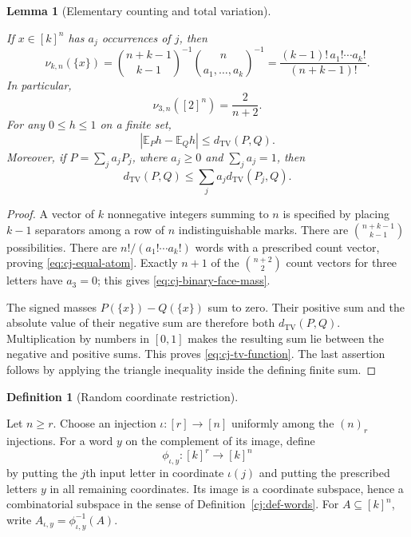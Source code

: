 \documentclass[11pt]{amsart}
\newtheorem{lemma}[theorem]{Lemma}
\theoremstyle{definition}
\newtheorem{definition}[theorem]{Definition}
\theoremstyle{remark}
\numberwithin{equation}{section}
\providecommand{\lean}[1]{}
\providecommand{\leanok}{}
\begin{document}
\begin{lemma}[Elementary counting and total variation]\label{cj:probability-facts}
\lean{Auto.cj_probability_facts_atom,Auto.cj_probability_facts_binary_face_mass,Auto.cj_probability_facts_tv_function,Auto.cj_probability_facts_mixture}
\leanok
If $x\in[k]^n$ has $a_j$ occurrences of $j$, then
\begin{equation}\label{eq:cj-equal-atom}
 \nu_{k,n}(\{x\})
 =\binom{n+k-1}{k-1}^{-1}\binom{n}{a_1,\ldots,a_k}^{-1}
 =\frac{(k-1)!\,a_1!\cdots a_k!}{(n+k-1)!}.
\end{equation}
In particular,
\begin{equation}\label{eq:cj-binary-face-mass}
 \nu_{3,n}([2]^n)=\frac{2}{n+2}.
\end{equation}
For any $0\le h\le1$ on a finite set,
\begin{equation}\label{eq:cj-tv-function}
 |\mathbb E_P h-\mathbb E_Qh|\le d_{\mathrm{TV}}(P,Q).
\end{equation}
Moreover, if $P=\sum_j a_jP_j$, where $a_j\ge0$ and $\sum_j a_j=1$,
then
\[
 d_{\mathrm{TV}}(P,Q)\le\sum_j a_jd_{\mathrm{TV}}(P_j,Q).
\]
\end{lemma}
\begin{proof}
A vector of $k$ nonnegative integers summing to $n$ is specified by
placing $k-1$ separators among a row of $n$ indistinguishable marks.
There are $\binom{n+k-1}{k-1}$ possibilities.  There are
$n!/(a_1!\cdots a_k!)$ words with a prescribed count vector, proving
\eqref{eq:cj-equal-atom}.  Exactly $n+1$ of the
$\binom{n+2}{2}$ count vectors for three letters have $a_3=0$;
this gives \eqref{eq:cj-binary-face-mass}.

The signed masses $P(\{x\})-Q(\{x\})$ sum to zero.  Their positive
sum and the absolute value of their negative sum are therefore both
$d_{\mathrm{TV}}(P,Q)$.  Multiplication by numbers in $[0,1]$ makes
the resulting sum lie between the negative and positive sums.  This
proves \eqref{eq:cj-tv-function}.  The last assertion follows by
applying the triangle inequality inside the defining finite sum.
\end{proof}

\begin{definition}[Random coordinate restriction]\label{cj:restriction}
\lean{Auto.restrictMap,Auto.restrictPre}
Let $n\ge r$.  Choose an injection $\iota:[r]\longrightarrow[n]$
uniformly among the $(n)_r$ injections.  For a word $y$ on the
complement of its image, define
\[
 \phi_{\iota,y}:[k]^r\longrightarrow[k]^n
\]
by putting the $j$th input letter in coordinate $\iota(j)$ and putting
the prescribed letters $y$ in all remaining coordinates.  Its image
is a coordinate subspace, hence a combinatorial subspace in the sense
of Definition~\ref{cj:def-words}.  For $A\subseteq[k]^n$, write
$A_{\iota,y}=\phi_{\iota,y}^{-1}(A)$.
\end{definition}
\end{document}
